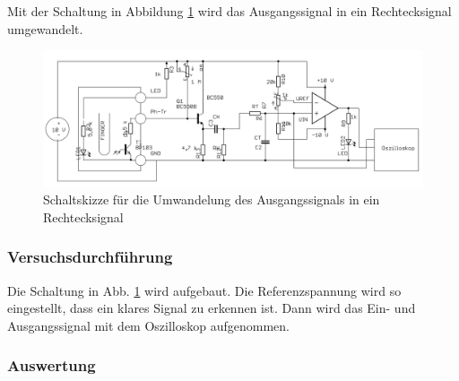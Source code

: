 \documentclass[12pt,a4paper]{article}
\begin{document}
Mit der Schaltung in Abbildung \ref{fig:auf_4} wird das Ausgangssignal in ein Rechtecksignal umgewandelt.

\begin{figure}[H] 
	\centering
	\includegraphics[scale = 0.3]{auf_4.png}
	\caption[Schaltskizze für die Umwandelung des Ausgangssignals in ein Rechtecksignal]{Schaltskizze für die Umwandelung des Ausgangssignals in ein Rechtecksignal\footnotemark}
	\label{fig:auf_4}
\end{figure}

\subsubsection*{Versuchsdurchführung}

Die Schaltung in Abb. \ref{fig:auf_4} wird aufgebaut. Die Referenzspannung wird so eingestellt, dass ein klares Signal zu erkennen ist. Dann wird das Ein- und Ausgangssignal mit dem Oszilloskop aufgenommen.

\subsubsection*{Auswertung}
\end{document}
